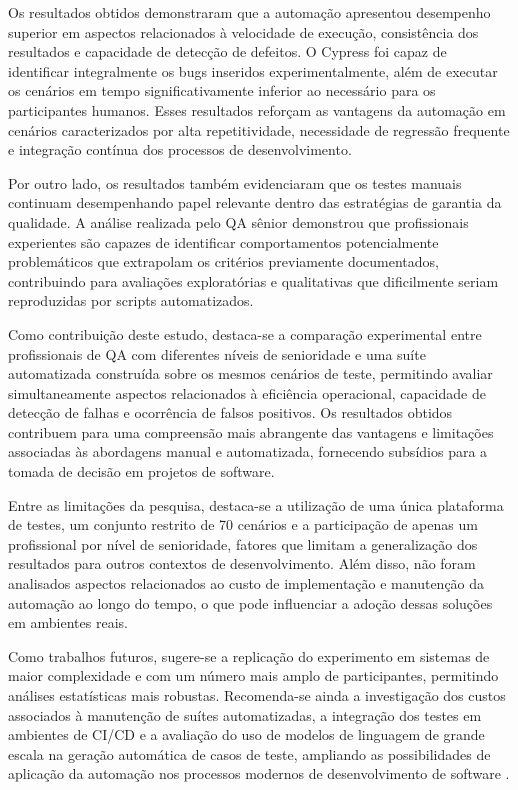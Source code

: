 \documentclass{UNESC}
\begin{document}
Os resultados obtidos demonstraram que a automação apresentou desempenho superior em aspectos relacionados à velocidade de execução, consistência dos resultados e capacidade de detecção de defeitos. O Cypress foi capaz de identificar integralmente os bugs inseridos experimentalmente, além de executar os cenários em tempo significativamente inferior ao necessário para os participantes humanos. Esses resultados reforçam as vantagens da automação em cenários caracterizados por alta repetitividade, necessidade de regressão frequente e integração contínua dos processos de desenvolvimento.

Por outro lado, os resultados também evidenciaram que os testes manuais continuam desempenhando papel relevante dentro das estratégias de garantia da qualidade. A análise realizada pelo QA sênior demonstrou que profissionais experientes são capazes de identificar comportamentos potencialmente problemáticos que extrapolam os critérios previamente documentados, contribuindo para avaliações exploratórias e qualitativas que dificilmente seriam reproduzidas por scripts automatizados.

Como contribuição deste estudo, destaca-se a comparação experimental entre profissionais de QA com diferentes níveis de senioridade e uma suíte automatizada construída sobre os mesmos cenários de teste, permitindo avaliar simultaneamente aspectos relacionados à eficiência operacional, capacidade de detecção de falhas e ocorrência de falsos positivos. Os resultados obtidos contribuem para uma compreensão mais abrangente das vantagens e limitações associadas às abordagens manual e automatizada, fornecendo subsídios para a tomada de decisão em projetos de software.

Entre as limitações da pesquisa, destaca-se a utilização de uma única plataforma de testes, um conjunto restrito de 70 cenários e a participação de apenas um profissional por nível de senioridade, fatores que limitam a generalização dos resultados para outros contextos de desenvolvimento. Além disso, não foram analisados aspectos relacionados ao custo de implementação e manutenção da automação ao longo do tempo, o que pode influenciar a adoção dessas soluções em ambientes reais.

Como trabalhos futuros, sugere-se a replicação do experimento em sistemas de maior complexidade e com um número mais amplo de participantes, permitindo análises estatísticas mais robustas. Recomenda-se ainda a investigação dos custos associados à manutenção de suítes automatizadas, a integração dos testes em ambientes de CI/CD e a avaliação do uso de modelos de linguagem de grande escala na geração automática de casos de teste, ampliando as possibilidades de aplicação da automação nos processos modernos de desenvolvimento de software \cite{ferreira2025acceptance}.
\end{document}
